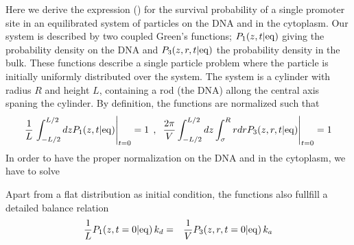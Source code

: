 Here we derive the expression () for the survival probability of a single promoter site in an equilibrated system of particles on the DNA and in the cytoplasm. Our system is described by two coupled Green's functions; $P_1(z,t|{\rm eq})$ giving the probability density on the DNA and $P_3(z,r,t|{\rm eq})$ the probability density in the bulk. These functions describe a single particle problem where the particle is initially uniformly distributed over the system. The system is a cylinder with radius $R$ and height $L$, containing a rod (the DNA) allong the central axis spaning the cylinder. By definition, the functions are normalized such that
\begin{equation}
 \frac{1}{L} \left. \int_{-L/2}^{L/2} dz P_1(z,t|{\rm eq})\right|_{t=0} = 1 \:\: , \:\: \left. \frac{2\pi}{V} \int_{-L/2}^{L/2} dz \int_{\sigma}^{R} rdr P_3(z,r,t|{\rm eq})\right|_{t=0} = 1
\end{equation}
In order to have the proper normalization on the DNA and in the cytoplasm, we have to solve


Apart from a flat distribution as initial condition, the functions also fullfill a detailed balance relation
\begin{eqnarray}
 \frac{1}{L} P_1(z,t=0|{\rm eq}) \, k_d & = & \frac{1}{V} P_3(z,r,t=0|{\rm eq}) \, k_a
 \elabel{DB_init}
\end{eqnarray}

